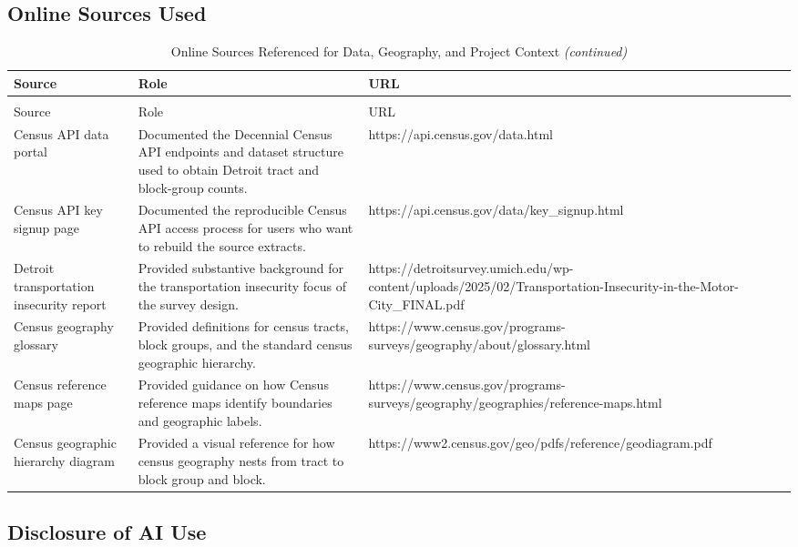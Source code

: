 \documentclass[
  11pt,
  letterpaper,
  DIV=11,
  numbers=noendperiod]{scrartcl}
\begin{document}
\subsection{Online Sources Used}\label{online-sources-used}

\begingroup\fontsize{8}{10}\selectfont

\begin{longtable}[t]{lll}
\caption{\label{tab:source-links}Online Sources Referenced for Data, Geography, and Project Context}\\
\toprule
Source & Role & URL\\
\midrule
\endfirsthead
\caption[]{Online Sources Referenced for Data, Geography, and Project Context \textit{(continued)}}\\
\toprule
Source & Role & URL\\
\midrule
\endhead

\endfoot
\bottomrule
\endlastfoot
Census API data portal & Documented the Decennial Census API endpoints and dataset structure used to obtain Detroit tract and block-group counts. & https://api.census.gov/data.html\\
Census API key signup page & Documented the reproducible Census API access process for users who want to rebuild the source extracts. & https://api.census.gov/data/key\_signup.html\\
Detroit transportation insecurity report & Provided substantive background for the transportation insecurity focus of the survey design. & https://detroitsurvey.umich.edu/wp-content/uploads/2025/02/Transportation-Insecurity-in-the-Motor-City\_FINAL.pdf\\
Census geography glossary & Provided definitions for census tracts, block groups, and the standard census geographic hierarchy. & https://www.census.gov/programs-surveys/geography/about/glossary.html\\
Census reference maps page & Provided guidance on how Census reference maps identify boundaries and geographic labels. & https://www.census.gov/programs-surveys/geography/geographies/reference-maps.html\\
Census geographic hierarchy diagram & Provided a visual reference for how census geography nests from tract to block group and block. & https://www2.census.gov/geo/pdfs/reference/geodiagram.pdf\\*
\end{longtable}
\endgroup{}

\subsection{Disclosure of AI Use}\label{disclosure-of-ai-use}
\end{document}
